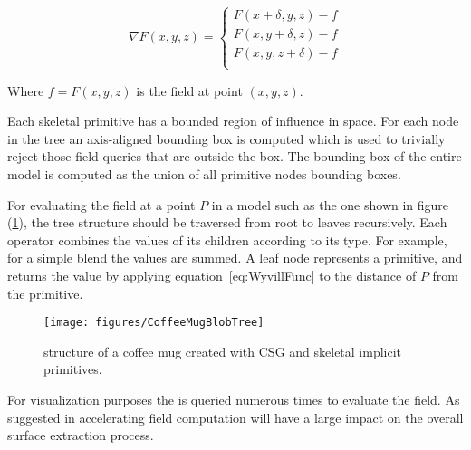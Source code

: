 \begin{equation}
\nabla F(x,y,z)=\left\{ \begin{array}{rl}
 F(x+\delta,y,z)-f \\
 F(x, y +\delta,z)-f \\
 F(x, y, z+\delta)-f \\
  \end{array} \right. 
\label{eq:Normal}
\end{equation}

Where $f = F(x,y,z)$ is the field at point $(x,y,z)$.

Each skeletal primitive has a bounded region of influence in space. For each node in the tree an
axis-aligned bounding box is computed which is used to trivially reject those field queries that 
are outside the box. The bounding box of the entire model is computed as the union of all primitive
nodes bounding boxes.

For evaluating the field  at a point $P$ in a \blob model such as the one shown in figure (\ref{fig:CoffeeMugBlobTree}), 
the tree structure should be traversed from root to leaves recursively. Each operator combines the values of its children 
according to its type. For example, for a simple blend the values are summed. A leaf node represents a primitive,  and 
returns the value by applying equation~\ref{eq:WyvillFunc} to the distance of $P$ from the primitive.

\begin{figure}[H]
\centering
  \texttt{[image: figures/CoffeeMugBlobTree]}
  \caption{\blob structure of a coffee mug created with CSG and skeletal implicit primitives.}
  \label{fig:CoffeeMugBlobTree}
\end{figure}

For visualization purposes the \blob is queried numerous times to evaluate the field. As suggested in \cite{SWG2005} 
accelerating field computation will have a large impact on the overall surface extraction process. 

